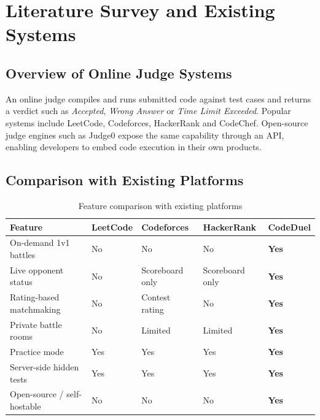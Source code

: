 \documentclass[12pt,a4paper,oneside]{report}
\begin{document}
\chapter{Literature Survey and Existing Systems}
\section{Overview of Online Judge Systems}
An online judge compiles and runs submitted code against test cases and returns a verdict such as
\emph{Accepted}, \emph{Wrong Answer} or \emph{Time Limit Exceeded}. Popular systems include LeetCode,
Codeforces, HackerRank and CodeChef. Open-source judge engines such as Judge0 expose the same capability
through an API, enabling developers to embed code execution in their own products.

\section{Comparison with Existing Platforms}
\begin{table}[H]
\centering
\small
\begin{tabularx}{\textwidth}{@{}lXXXX@{}}
\toprule
\textbf{Feature} & \textbf{LeetCode} & \textbf{Codeforces} & \textbf{HackerRank} & \textbf{CodeDuel} \\
\midrule
On-demand 1v1 battles      & No  & No  & No  & \textbf{Yes} \\
Live opponent status       & No  & Scoreboard only & Scoreboard only & \textbf{Yes} \\
Rating-based matchmaking   & No  & Contest rating & No & \textbf{Yes} \\
Private battle rooms       & No  & Limited & Limited & \textbf{Yes} \\
Practice mode              & Yes & Yes & Yes & \textbf{Yes} \\
Server-side hidden tests   & Yes & Yes & Yes & \textbf{Yes} \\
Open-source / self-hostable& No  & No  & No  & \textbf{Yes} \\
\bottomrule
\end{tabularx}
\caption{Feature comparison with existing platforms}
\end{table}
\end{document}
